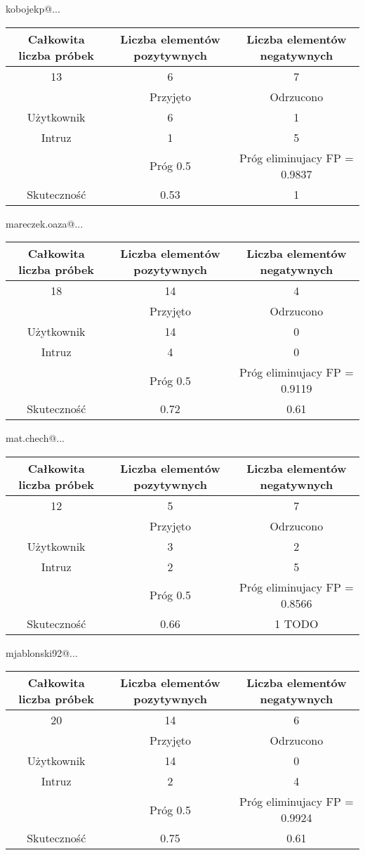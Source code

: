 		kobojekp@... \\
		\begin{tabular}{|c|c|c|}
		\hline
		Całkowita liczba próbek & Liczba elementów pozytywnych & Liczba elementów negatywnych \\ \hline
		13 & 6 & 7 \\ \hline
		& Przyjęto & Odrzucono \\ \hline
		Użytkownik & 6 & 1 \\ \hline
		Intruz & 1 & 5 \\ \hline
		& Próg 0.5 & Próg eliminujacy FP = 0.9837 \\ \hline
		Skuteczność & 0.53 & 1 \\ \hline
		\end{tabular}

		mareczek.oaza@... \\
		\begin{tabular}{|c|c|c|}
		\hline
		Całkowita liczba próbek & Liczba elementów pozytywnych & Liczba elementów negatywnych \\ \hline
		18 & 14 & 4 \\ \hline
		& Przyjęto & Odrzucono \\ \hline
		Użytkownik & 14 & 0 \\ \hline
		Intruz & 4 & 0 \\ \hline
		& Próg 0.5 & Próg eliminujacy FP = 0.9119 \\ \hline
		Skuteczność & 0.72 & 0.61 \\ \hline
		\end{tabular}

		mat.chech@... \\
		\begin{tabular}{|c|c|c|}
		\hline
		Całkowita liczba próbek & Liczba elementów pozytywnych & Liczba elementów negatywnych \\ \hline
			    	  12  & 5             & 7 \\ \hline
						    & Przyjęto   & Odrzucono \\ \hline
		Użytkownik  & 3             & 2 \\ \hline
		Intruz		    & 2             & 5 \\ \hline
						    & Próg 0.5  & Próg eliminujacy FP = 0.8566 \\ \hline
		Skuteczność & 0.66       & 1 TODO\\ \hline
		\end{tabular}

		mjablonski92@... \\
		\begin{tabular}{|c|c|c|}
		\hline
		Całkowita liczba próbek & Liczba elementów pozytywnych & Liczba elementów negatywnych \\ \hline
		20 & 14 & 6 \\ \hline
						   & Przyjęto & Odrzucono \\ \hline
		Użytkownik & 14 & 0 \\ \hline
		Intruz & 2 & 4 \\ \hline
		& Próg 0.5 & Próg eliminujacy FP = 0.9924 \\ \hline
		Skuteczność & 0.75 & 0.61 \\ \hline
		\end{tabular}

